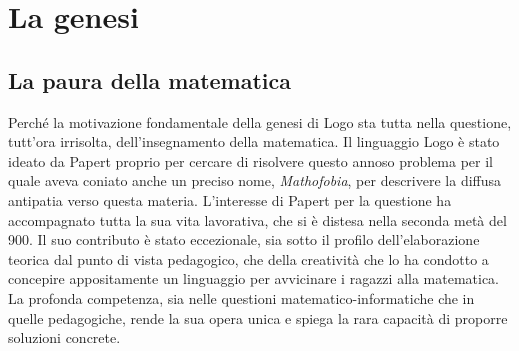 \chapter{La genesi} \label{cap:papert}

\section{La paura della matematica}

Perché la motivazione fondamentale della genesi di Logo sta tutta nella questione, tutt'ora irrisolta, dell'insegnamento della matematica. Il linguaggio Logo è stato ideato da Papert proprio per cercare di risolvere questo annoso problema per il quale aveva coniato anche un preciso nome, \textit{Mathofobia}, per descrivere la diffusa antipatia verso questa materia. L'interesse di Papert per la questione ha accompagnato tutta la sua vita lavorativa, che si è distesa nella seconda metà del 900. Il suo contributo è stato eccezionale, sia sotto il profilo dell'elaborazione teorica dal punto di vista pedagogico, che della creatività che lo ha condotto a concepire appositamente un linguaggio per avvicinare i ragazzi alla matematica. La profonda competenza, sia nelle questioni matematico-informatiche che in quelle pedagogiche, rende la sua opera unica e spiega la rara capacità di proporre soluzioni concrete. 


